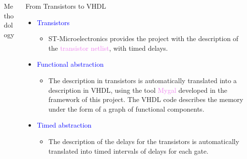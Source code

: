 \documentclass[final]{beamer}
\newcommand{\couleur}[1]{\textcolor{violet}{#1}}
\newcommand{\coulitem}[1]{\textcolor{blue}{#1}}
\begin{document}
\begin{frame}{}
\begin{columns}[t]
\begin{column}{.45\linewidth}
\begin{block}{Methodology}
\end{block}    

\end{column}


\begin{column}{.45\linewidth}

\begin{block}{From Transistors to VHDL}

\begin{itemize}
	\item \coulitem{Transistors}
	\begin{itemize}
		\item ST-Microelectronics provides the project with the description of the \couleur{transistor netlist}, with timed delays.
	\end{itemize}


		

	\item \coulitem{Functional abstraction}
	\begin{itemize}
		\item The description in transistors is automatically translated into a description in VHDL, using the tool \couleur{Mygal} developed in the framework of this project.
 		The VHDL code describes the memory under the form of a graph of functional components.
	\end{itemize}

	\item \coulitem{Timed abstraction}
	\begin{itemize}
		\item The description of the delays for the transistors is automatically translated into timed intervals of delays for each gate.
	\end{itemize}


\end{itemize}

\end{block}    



\end{column}
\end{columns}
\end{frame}
\end{document}
